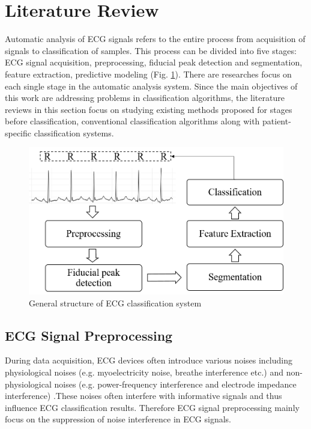 \section{Literature Review}
Automatic analysis of ECG signals refers to the entire process from acquisition of signals to classification of samples. This process can be divided into five stages: ECG signal acquisition, preprocessing, fiducial peak detection and segmentation, feature extraction, predictive modeling (Fig. \ref{fig:1-1}). There are researches focus on each single stage in the automatic analysis system. Since the main objectives of this work are addressing problems in classification algorithms, the literature reviews in this section focus on studying existing methods proposed for stages before classification, conventional classification algorithms along with patient-specific classification systems. 

 \begin{figure}[thpb]
 	\centering
 	\includegraphics[scale=0.7]{Fig/general_flow.png}  
 	\caption{General structure of ECG classification system}
 	\label{fig:1-1}
 \end{figure}


\subsection{ECG Signal Preprocessing}

During data acquisition, ECG devices often introduce various noises including physiological noises (e.g. myoelectricity noise, breathe interference etc.) and non-physiological noises (e.g. power-frequency interference and electrode impedance interference) \cite{denoise}.These noises often interfere with informative signals and thus influence ECG classification results. Therefore ECG signal preprocessing mainly focus on the suppression of noise interference in ECG signals.


